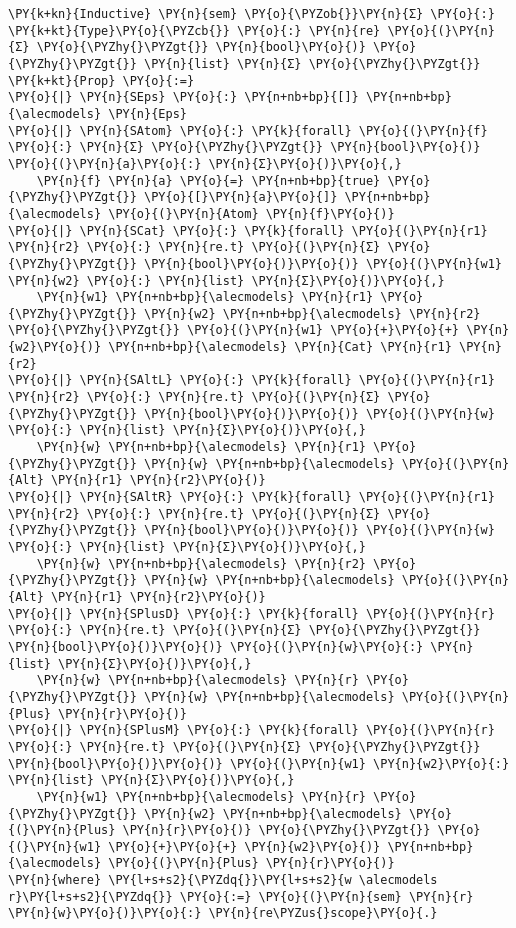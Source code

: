 \begin{Verbatim}[commandchars=\\\{\}]
\PY{k+kn}{Inductive} \PY{n}{sem} \PY{o}{\PYZob{}}\PY{n}{Σ} \PY{o}{:} \PY{k+kt}{Type}\PY{o}{\PYZcb{}} \PY{o}{:} \PY{n}{re} \PY{o}{(}\PY{n}{Σ} \PY{o}{\PYZhy{}\PYZgt{}} \PY{n}{bool}\PY{o}{)} \PY{o}{\PYZhy{}\PYZgt{}} \PY{n}{list} \PY{n}{Σ} \PY{o}{\PYZhy{}\PYZgt{}} \PY{k+kt}{Prop} \PY{o}{:=}
\PY{o}{|} \PY{n}{SEps} \PY{o}{:} \PY{n+nb+bp}{[]} \PY{n+nb+bp}{\alecmodels} \PY{n}{Eps}
\PY{o}{|} \PY{n}{SAtom} \PY{o}{:} \PY{k}{forall} \PY{o}{(}\PY{n}{f} \PY{o}{:} \PY{n}{Σ} \PY{o}{\PYZhy{}\PYZgt{}} \PY{n}{bool}\PY{o}{)} \PY{o}{(}\PY{n}{a}\PY{o}{:} \PY{n}{Σ}\PY{o}{)}\PY{o}{,}
    \PY{n}{f} \PY{n}{a} \PY{o}{=} \PY{n+nb+bp}{true} \PY{o}{\PYZhy{}\PYZgt{}} \PY{o}{[}\PY{n}{a}\PY{o}{]} \PY{n+nb+bp}{\alecmodels} \PY{o}{(}\PY{n}{Atom} \PY{n}{f}\PY{o}{)}
\PY{o}{|} \PY{n}{SCat} \PY{o}{:} \PY{k}{forall} \PY{o}{(}\PY{n}{r1} \PY{n}{r2} \PY{o}{:} \PY{n}{re.t} \PY{o}{(}\PY{n}{Σ} \PY{o}{\PYZhy{}\PYZgt{}} \PY{n}{bool}\PY{o}{)}\PY{o}{)} \PY{o}{(}\PY{n}{w1} \PY{n}{w2} \PY{o}{:} \PY{n}{list} \PY{n}{Σ}\PY{o}{)}\PY{o}{,}
    \PY{n}{w1} \PY{n+nb+bp}{\alecmodels} \PY{n}{r1} \PY{o}{\PYZhy{}\PYZgt{}} \PY{n}{w2} \PY{n+nb+bp}{\alecmodels} \PY{n}{r2} \PY{o}{\PYZhy{}\PYZgt{}} \PY{o}{(}\PY{n}{w1} \PY{o}{+}\PY{o}{+} \PY{n}{w2}\PY{o}{)} \PY{n+nb+bp}{\alecmodels} \PY{n}{Cat} \PY{n}{r1} \PY{n}{r2}
\PY{o}{|} \PY{n}{SAltL} \PY{o}{:} \PY{k}{forall} \PY{o}{(}\PY{n}{r1} \PY{n}{r2} \PY{o}{:} \PY{n}{re.t} \PY{o}{(}\PY{n}{Σ} \PY{o}{\PYZhy{}\PYZgt{}} \PY{n}{bool}\PY{o}{)}\PY{o}{)} \PY{o}{(}\PY{n}{w} \PY{o}{:} \PY{n}{list} \PY{n}{Σ}\PY{o}{)}\PY{o}{,}
    \PY{n}{w} \PY{n+nb+bp}{\alecmodels} \PY{n}{r1} \PY{o}{\PYZhy{}\PYZgt{}} \PY{n}{w} \PY{n+nb+bp}{\alecmodels} \PY{o}{(}\PY{n}{Alt} \PY{n}{r1} \PY{n}{r2}\PY{o}{)}
\PY{o}{|} \PY{n}{SAltR} \PY{o}{:} \PY{k}{forall} \PY{o}{(}\PY{n}{r1} \PY{n}{r2} \PY{o}{:} \PY{n}{re.t} \PY{o}{(}\PY{n}{Σ} \PY{o}{\PYZhy{}\PYZgt{}} \PY{n}{bool}\PY{o}{)}\PY{o}{)} \PY{o}{(}\PY{n}{w} \PY{o}{:} \PY{n}{list} \PY{n}{Σ}\PY{o}{)}\PY{o}{,}
    \PY{n}{w} \PY{n+nb+bp}{\alecmodels} \PY{n}{r2} \PY{o}{\PYZhy{}\PYZgt{}} \PY{n}{w} \PY{n+nb+bp}{\alecmodels} \PY{o}{(}\PY{n}{Alt} \PY{n}{r1} \PY{n}{r2}\PY{o}{)}
\PY{o}{|} \PY{n}{SPlusD} \PY{o}{:} \PY{k}{forall} \PY{o}{(}\PY{n}{r} \PY{o}{:} \PY{n}{re.t} \PY{o}{(}\PY{n}{Σ} \PY{o}{\PYZhy{}\PYZgt{}} \PY{n}{bool}\PY{o}{)}\PY{o}{)} \PY{o}{(}\PY{n}{w}\PY{o}{:} \PY{n}{list} \PY{n}{Σ}\PY{o}{)}\PY{o}{,}
    \PY{n}{w} \PY{n+nb+bp}{\alecmodels} \PY{n}{r} \PY{o}{\PYZhy{}\PYZgt{}} \PY{n}{w} \PY{n+nb+bp}{\alecmodels} \PY{o}{(}\PY{n}{Plus} \PY{n}{r}\PY{o}{)}
\PY{o}{|} \PY{n}{SPlusM} \PY{o}{:} \PY{k}{forall} \PY{o}{(}\PY{n}{r} \PY{o}{:} \PY{n}{re.t} \PY{o}{(}\PY{n}{Σ} \PY{o}{\PYZhy{}\PYZgt{}} \PY{n}{bool}\PY{o}{)}\PY{o}{)} \PY{o}{(}\PY{n}{w1} \PY{n}{w2}\PY{o}{:} \PY{n}{list} \PY{n}{Σ}\PY{o}{)}\PY{o}{,}
    \PY{n}{w1} \PY{n+nb+bp}{\alecmodels} \PY{n}{r} \PY{o}{\PYZhy{}\PYZgt{}} \PY{n}{w2} \PY{n+nb+bp}{\alecmodels} \PY{o}{(}\PY{n}{Plus} \PY{n}{r}\PY{o}{)} \PY{o}{\PYZhy{}\PYZgt{}} \PY{o}{(}\PY{n}{w1} \PY{o}{+}\PY{o}{+} \PY{n}{w2}\PY{o}{)} \PY{n+nb+bp}{\alecmodels} \PY{o}{(}\PY{n}{Plus} \PY{n}{r}\PY{o}{)}
\PY{n}{where} \PY{l+s+s2}{\PYZdq{}}\PY{l+s+s2}{w \alecmodels r}\PY{l+s+s2}{\PYZdq{}} \PY{o}{:=} \PY{o}{(}\PY{n}{sem} \PY{n}{r} \PY{n}{w}\PY{o}{)}\PY{o}{:} \PY{n}{re\PYZus{}scope}\PY{o}{.}
\end{Verbatim}
